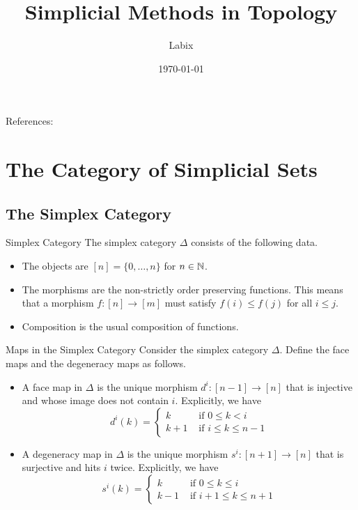 \documentclass[a4paper]{article}
\title{Simplicial Methods in Topology}
\author{Labix}
\date{\today}
\begin{document}
\maketitle
\begin{abstract}

\end{abstract}
References: 

\pagebreak
\tableofcontents

\pagebreak

\section{The Category of Simplicial Sets}
\subsection{The Simplex Category}
\begin{defn}{Simplex Category}{} The simplex category $\Delta$ consists of the following data. 
\begin{itemize}
\item The objects are $[n]=\{0,\dots,n\}$ for $n\in\mathbb{N}$. 
\item The morphisms are the non-strictly order preserving functions. This means that a morphism $f:[n]\to[m]$ must satisfy $f(i)\leq f(j)$ for all $i\leq j$. 
\item Composition is the usual composition of functions. 
\end{itemize}
\end{defn}

\begin{defn}{Maps in the Simplex Category}{} Consider the simplex category $\Delta$. Define the face maps and the degeneracy maps as follows. 
\begin{itemize}
\item A face map in $\Delta$ is the unique morphism $d^i:[n-1]\to[n]$ that is injective and whose image does not contain $i$. Explicitly, we have $$d^i(k)=\begin{cases}
k & \text{ if } 0\leq k <i\\
k+1 & \text{ if } i\leq k\leq n-1
\end{cases}$$
\item A degeneracy map in $\Delta$ is the unique morphism $s^i:[n+1]\to[n]$ that is surjective and hits $i$ twice. Explicitly, we have $$s^i(k)=\begin{cases}
k & \text{ if } 0\leq k\leq i\\
k-1 & \text{ if } i+1\leq k\leq n+1
\end{cases}$$
\end{itemize}
\end{defn}
\end{document}
